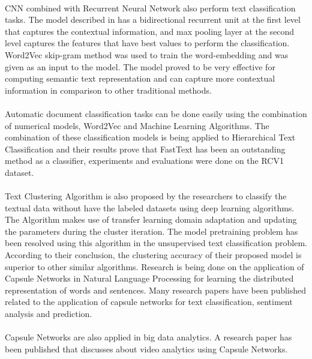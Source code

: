 \documentclass[a4paper,12pt]{report}
\begin{document}
\paragraph{}
CNN combined with Recurrent Neural Network also perform text classification tasks. The model described in \cite{Lai} has a bidirectional recurrent unit at the first level that captures the contextual information, and max pooling layer at the second level captures the  features that have best values to perform the classification. Word2Vec skip-gram method was used to train the word-embedding and was given as an input to the model. The model proved to be very effective for computing semantic text representation and can capture more contextual information in comparison to other traditional methods.

\paragraph{}
Automatic document classification tasks can be done easily using the combination of numerical models, Word2Vec and Machine Learning Algorithms.  The combination of these classification models is being applied to Hierarchical Text Classification and their results prove that FastText has been an outstanding method as a classifier, experiments and evaluations were done on the RCV1 dataset. \cite{Alan,Huang}

\paragraph{}
Text Clustering Algorithm is also proposed by the researchers to classify the textual data without have the labeled datasets using deep learning algorithms. The Algorithm makes use of transfer learning domain adaptation and updating the parameters during the cluster iteration. \cite{B} The model pretraining problem has been resolved using this algorithm in the unsupervised text classification problem. According to their conclusion, the clustering accuracy of their proposed model is superior to other similar algorithms.  Research is being done on the application of Capsule Networks in Natural Language Processing for learning the distributed representation of words and sentences. Many research papers have been published related to the application of capsule networks for text classification, sentiment analysis and prediction. 

\paragraph{}
Capsule Networks are also applied in big data analytics. A research paper has been published that discusses about video analytics using Capsule Networks.  
\end{document}
